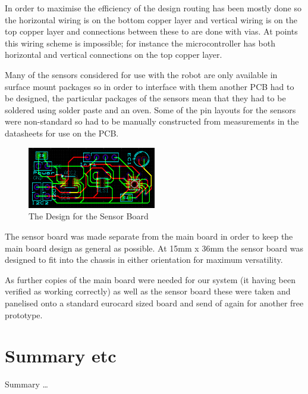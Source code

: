 In order to maximise the efficiency of the design routing has been mostly done so the horizontal wiring is on the bottom copper layer and vertical wiring is on the top copper layer and connections between these to are done with vias. At points this wiring scheme is impossible; for instance the microcontroller has both horizontal and vertical connections on the top copper layer.

Many of the sensors considered for use with the robot are only available in surface mount packages so in order to interface with them another PCB had to be designed, the particular packages of the sensors mean that they had to be soldered using solder paste and an oven. Some of the pin layouts for the sensors were non-standard so had to be manually constructed from measurements in the datasheets for use on the PCB.

\begin{figure}[!htb]
  	\centering
  	\includegraphics[width=0.5\textwidth]{Figures/SensorPCBDesign.png}
  	\caption{The Design for the Sensor Board}
 	\label{Figure:SensorPCBDesign}
\end{figure}

The sensor board was made separate from the main board in order to keep the main board design as general as possible. At 15mm x 36mm the sensor board was designed to fit into the chassis in either orientation for maximum versatility.

As further copies of the main board were needed for our system (it having been verified as working correctly) as well as the sensor board these were taken and panelised onto a standard eurocard sized board and send of again for another free prototype.


\section{Summary etc}
Summary \dots

